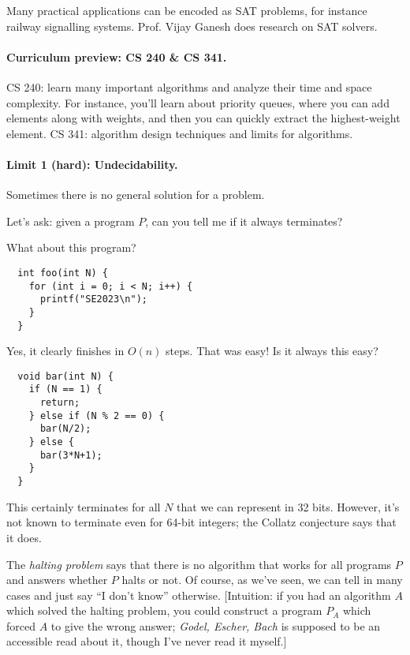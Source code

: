 \documentclass[11pt]{article}
\begin{document}
Many practical applications can be encoded as SAT problems, for
instance railway signalling systems. Prof. Vijay Ganesh does research
on SAT solvers.

\paragraph{Curriculum preview: CS 240 \& CS 341.}
CS 240: learn many important algorithms
and analyze their time and space complexity. For 
instance, you'll learn about priority queues, where
you can add elements along with weights, and
then you can quickly extract the highest-weight element.
CS 341: algorithm design techniques and limits for algorithms.

\paragraph{Limit 1 (hard): Undecidability.} Sometimes there 
is no general solution for a problem.

Let's ask: given a program $P$, can you tell me if it always 
terminates?

What about this program?

\begin{lstlisting}
  int foo(int N) {
    for (int i = 0; i < N; i++) {
      printf("SE2023\n");
    }
  }
\end{lstlisting}

Yes, it clearly finishes in $O(n)$ steps. That was easy! Is it always this easy?

\begin{lstlisting}
  void bar(int N) {
    if (N == 1) {
      return;
    } else if (N % 2 == 0) {
      bar(N/2);
    } else {
      bar(3*N+1);
    }
  }
\end{lstlisting}

This certainly terminates for all $N$ that we can represent in 32 bits. However, it's not
known to terminate even for 64-bit integers; the Collatz conjecture says that it does.

The \emph{halting problem} says that there is no algorithm that works for all programs $P$
and answers whether $P$ halts or not. Of course, as we've seen, we can tell in many cases
and just say ``I don't know'' otherwise. [Intuition: if you had an algorithm $A$ which solved
the halting problem, you could construct a program $P_A$ which forced $A$ to give the wrong answer;
\emph{Godel, Escher, Bach} is supposed to be an accessible read about it, though I've never read it
myself.]
\end{document}
